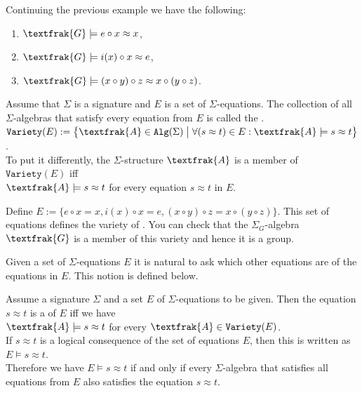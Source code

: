 \example
Continuing the previous example we have the following:
\begin{enumerate}
\item $\textfrak{G} \models e \circ x \approx x$,
\item $\textfrak{G} \models i(x) \circ x \approx e$,
\item $\textfrak{G} \models (x \circ y) \circ z \approx x \circ (y \circ z)$. \eoxs
\end{enumerate}

\begin{Definition}[$E$-Variety]
  Assume that $\Sigma$ is a signature and $E$ is a set of $\Sigma$-equations.  The collection of all
  $\Sigma$-algebras that satisfy every equation from $E$ is called the .
  \\[0.2cm]
  \hspace*{1.3cm}
  $\texttt{Variety}(E) := \bigl\{ \textfrak{A}\in \mathtt{Alg}(\Sigma) \bigm| 
                             \forall (s \approx t) \in E: \textfrak{A} \models s \approx t \bigr\}$.
  \\[0.2cm]
  To put it differently, the $\Sigma$-structure $\textfrak{A}$ is a member of $\mathtt{Variety}(E)$ iff
  \\[0.2cm]
  \hspace*{1.3cm}
  $\textfrak{A} \models s \approx t$ \quad for every equation $s \approx t$ in $E$. \eoxs
\end{Definition}

\example
Define $E := \bigl\{ e \circ x = x, i(x) \circ x = e, (x \circ y) \circ z = x \circ (y \circ z) \bigr\}$.
This set of equations defines the variety of .  You can check that the $\Sigma_G$-algebra
$\textfrak{G}$ is a member of this variety and hence it is a group.  
\eoxs

Given a set of $\Sigma$-equations $E$ it is natural to ask which other equations are  of
the equations in $E$.  This notion is defined below. 

\begin{Definition}
  Assume a signature $\Sigma$ and a set $E$ of $\Sigma$-equations to be given.
  Then the equation $s \approx t$ is a  of $E$ iff we have
  \\[0.2cm]
  \hspace*{1.3cm}
  $\textfrak{A} \models s \approx t$ \quad for every $\textfrak{A} \in \mathtt{Variety}(E)$.
  \\[0.2cm]
  If $s \approx t$ is a logical consequence of the set of equations $E$, then this is written as
  \\[0.2cm]
  \hspace*{1.3cm}
  $E \models s \approx t$.
  \\[0.2cm]
  Therefore we have $E \models s \approx t$ if and only if every $\Sigma$-algebra that satisfies all equations
  from $E$ also satisfies the equation $s \approx t$. \eoxs
\end{Definition}

